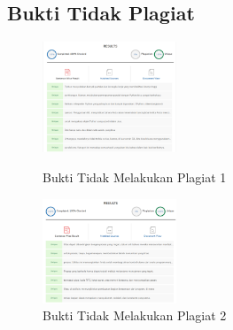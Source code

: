 \subsection{Bukti Tidak Plagiat}
\begin{figure}[H]
	\includegraphics[width=4cm]{figures/kelompok1/1/tomy/plagiat_tomy_1.PNG}
	\centering
	\caption{Bukti Tidak Melakukan Plagiat 1}
    \includegraphics[width=4cm]{figures/kelompok1/1/tomy/plagiat_tomy_2.PNG}
	\centering
	\caption{Bukti Tidak Melakukan Plagiat 2}
\end{figure}